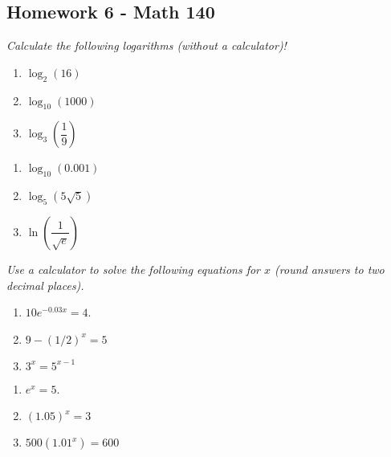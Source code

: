 \documentclass[10pt]{article}
\begin{document}
\pagestyle{empty}
\subsection*{Homework 6 - Math 140}

\noindent
\textit{Calculate the following logarithms (without a calculator)!}

\begin{multicols}{3}
\begin{enumerate}
\setcounter{enumi}{\theenumCount}
\item $\log_2(16)$

\item $\log_{10}(1000)$

\item $\log_{3}\left(\dfrac{1}{9}\right)$


\setcounter{enumCount}{\theenumi}
\end{enumerate} 
\end{multicols}
\vfill


\begin{multicols}{3}
\begin{enumerate}
\setcounter{enumi}{\theenumCount}
\item $\log_{10}(0.001)$

\item $\log_{5}(5\sqrt{5})$

\item $\ln\left(\dfrac{1}{ \sqrt{e} }\right)$


\setcounter{enumCount}{\theenumi}
\end{enumerate} 
\end{multicols}
\vfill

\noindent
\textit{Use a calculator to solve the following equations for $x$ (round answers to two decimal places).} 
\begin{multicols}{3}
\begin{enumerate}
\setcounter{enumi}{\theenumCount}
\item $10 e^{-0.03x} = 4$.

\item $9 - (1/2)^x = 5$

\item $3^x = 5^{x-1}$

\setcounter{enumCount}{\theenumi}
\end{enumerate} 
\end{multicols}
\vfill

\begin{multicols}{3}
\begin{enumerate}
\setcounter{enumi}{\theenumCount}
\item $e^x = 5$.

\item $(1.05)^x = 3$

\item $500(1.01^x) = 600$

\setcounter{enumCount}{\theenumi}
\end{enumerate} 
\end{multicols}
\vfill
\end{document}
